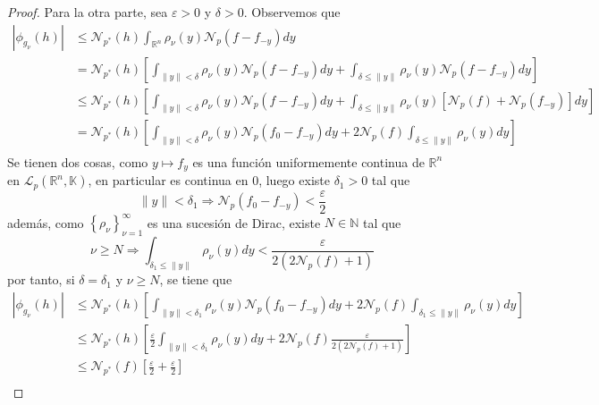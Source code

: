 \documentclass[12pt]{report}
\theoremstyle{largebreak}
\newcommand\abs[1]{\ensuremath{\left|#1\right|}}
\newcommand{\N}[2]{\ensuremath{\mathcal{N}_{#1}\left(#2\right)}}
\newcommand{\norm}[1]{\ensuremath{\|#1\|}}
\begin{document}
\begin{proof}
        Para la otra parte, sea $\varepsilon>0$ y $\delta>0$. Observemos que
        \begin{equation*}
            \begin{split}
                \abs{\phi_{ g_\nu}(h)}&\leq\N{p^*}{h}\int_{\mathbb{R}^n}\rho_\nu(y)\N{p}{f-f_{-y}}dy\\
                &=\N{p^*}{h}\left[\int_{\norm{y}<\delta}\rho_\nu(y)\N{p}{f-f_{-y}}dy+\int_{\delta\leq\norm{y}}\rho_\nu(y)\N{p}{f-f_{-y}}dy\right]\\
                &\leq\N{p^*}{h}\left[\int_{\norm{y}<\delta}\rho_\nu(y)\N{p}{f-f_{-y}}dy+\int_{\delta\leq\norm{y}}\rho_\nu(y)\left[\N{p}{f}+\N{p}{f_{-y}}\right]dy\right]\\
                &=\N{p^*}{h}\left[\int_{\norm{y}<\delta}\rho_\nu(y)\N{p}{f_0-f_{-y}}dy+2\N{p}{f}\int_{\delta\leq\norm{y}}\rho_\nu(y)dy\right]\\
            \end{split}
        \end{equation*}
        Se tienen dos cosas, como $y\mapsto f_y$ es una función uniformemente continua de $\mathbb{R}^n$ en $\mathcal{L}_p(\mathbb{R}^n,\mathbb{K})$, en particular es continua en $0$, luego existe $\delta_1>0$ tal que
        \begin{equation*}
            \norm{y}<\delta_1\Rightarrow \N{p}{f_0-f_{-y}}<\frac{\varepsilon}{2}
        \end{equation*}
        además, como $\left\{\rho_\nu \right\}_{ \nu=1}^\infty$ es una sucesión de Dirac, existe $N\in\mathbb{N}$ tal que
        \begin{equation*}
            \nu\geq N\Rightarrow\int_{\delta_1\leq\norm{y}}\rho_\nu(y)dy<\frac{\varepsilon}{2\left(2\N{p}{f}+1 \right)}
        \end{equation*}
        por tanto, si $\delta=\delta_1$ y $\nu\geq N$, se tiene que
        \begin{equation*}
            \begin{split}
                \abs{\phi_{ g_\nu}(h)}&\leq\N{p^*}{h}\left[\int_{\norm{y}<\delta_1}\rho_\nu(y)\N{p}{f_0-f_{-y}}dy+2\N{p}{f}\int_{\delta_1\leq\norm{y}}\rho_\nu(y)dy\right]\\
                &\leq\N{p^*}{h}\left[\frac{\varepsilon}{2}\int_{\norm{y}<\delta_1}\rho_\nu(y)dy+2\N{p}{f}\frac{\varepsilon}{2\left(2\N{p}{f}+1 \right)}\right]\\
                &\leq\N{p^*}{f}\left[\frac{\varepsilon}{2}+\frac{\varepsilon}{2}\right]\\

\end{split}
\end{equation*}
\end{proof}
\end{document}
